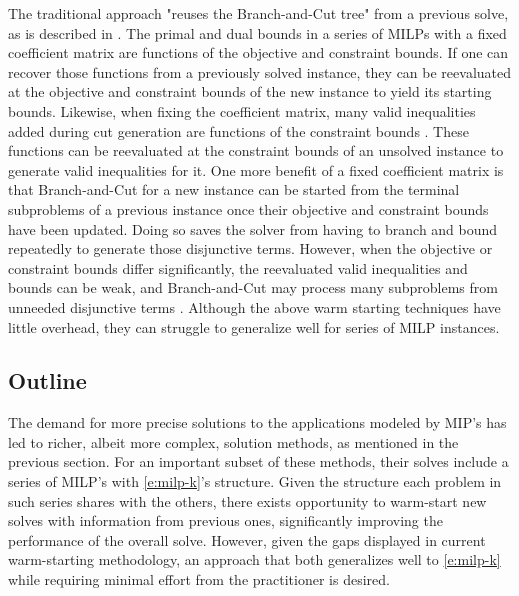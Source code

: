 \documentclass[10pt]{article}
\begin{document}
	The traditional approach "reuses the Branch-and-Cut tree" from a previous solve, as is described in \cite{ws}. The primal and dual bounds in a series of MILPs with a fixed coefficient matrix are functions of the objective and constraint bounds. If one can recover those functions from a previously solved instance, they can be reevaluated at the objective and constraint bounds of the new instance to yield its starting bounds. Likewise, when fixing the coefficient matrix, many valid inequalities added during cut generation are functions of the constraint bounds \cite{guz}. These functions can be reevaluated at the constraint bounds of an unsolved instance to generate valid inequalities for it. One more benefit of a fixed coefficient matrix is that Branch-and-Cut for a new instance can be started from the terminal subproblems of a previous instance once their objective and constraint bounds have been updated. Doing so saves the solver from having to branch and bound repeatedly to generate those disjunctive terms. However, when the objective or constraint bounds differ significantly, the reevaluated valid inequalities and bounds can be weak, and Branch-and-Cut may process many subproblems from unneeded disjunctive terms \cite{ws}. Although the above warm starting techniques have little overhead, they can struggle to generalize well for series of MILP instances.
	
	\subsection{Outline} \label{ss:outline}
	The demand for more precise solutions to the applications modeled by MIP's has led to richer, albeit more complex, solution methods, as mentioned in the previous section. For an important subset of these methods, their solves include a series of MILP's with \ref{e:milp-k}'s structure. Given the structure each problem in such series shares with the others, there exists opportunity to warm-start new solves with information from previous ones, significantly improving the performance of the overall solve. However, given the gaps displayed in current warm-starting methodology, an approach that both generalizes well to \ref{e:milp-k} while requiring minimal effort from the practitioner is desired.
	
\end{document}

